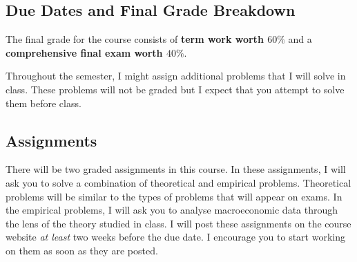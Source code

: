 \documentclass[letterpaper,12pt]{article}
\theoremstyle{dotlessS}
\begin{document}
\subsection*{Due Dates and Final Grade Breakdown}
The final grade for the course consists of \textbf{term work worth $60\%$} and a \textbf{comprehensive final exam worth $40\%$}.
\\
\begin{table}[!h]
\begin{minipage}[h]{1\textwidth}
\centering
{}
\end{minipage}
\end{table}	

\noindent Throughout the semester, I might assign additional problems that I will solve in class. These problems will not be graded but I expect that you attempt to solve them before class.\\ 
\subsection*{Assignments}
There will be two graded assignments in this course. In these assignments, I will ask you to solve a combination of theoretical and empirical problems. Theoretical problems will be similar to the types of problems that will appear on exams. In the empirical problems, I will ask you to analyse macroeconomic data through the lens of the theory studied in class. I will post these assignments on the course website \textit{at least} two weeks before the due date. I encourage you to start working on them as soon as they are posted. 
\end{document}
